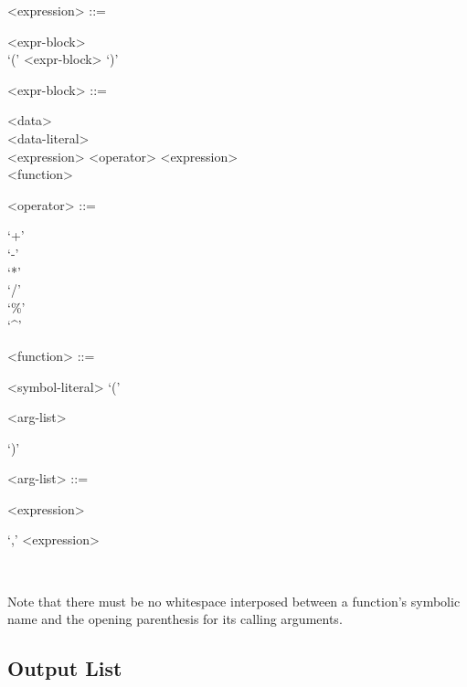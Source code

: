 \begin{grammar}
  <expression> ::= \begin{syntdiag}
    \begin{stack}
      <expr-block> \\
      `(' <expr-block> `)'
    \end{stack}
  \end{syntdiag}

  <expr-block> ::= \begin{syntdiag}
    \begin{stack}
      <data> \\
      <data-literal> \\
      <expression> <operator> <expression> \\
      <function>
    \end{stack}
  \end{syntdiag}

  <operator> ::= \begin{syntdiag}
    \begin{stack}
      `+' \\
      `-' \\
      `*' \\
      `/' \\
      `\%' \\
      `^'
    \end{stack}
  \end{syntdiag}

  <function> ::= \begin{syntdiag}
    <symbol-literal>
    `('
    \begin{stack}
      <arg-list> \\
    \end{stack}
    `)'
  \end{syntdiag}

  <arg-list> ::= \begin{syntdiag}
    <expression>
    \begin{stack}
      \begin{rep}`,' <expression>\end{rep} \\
    \end{stack}
  \end{syntdiag}
\end{grammar}

Note that there must be no whitespace interposed between a function's
symbolic name and the opening parenthesis for its calling arguments.

\subsection{Output List}

